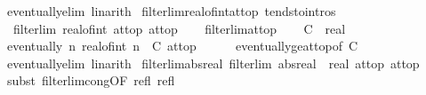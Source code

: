\begin{isabellebody}
\ eventually{\isacharunderscore}{\kern0pt}elim\ linarith\isanewline
{}\isamarkupfalse%
%
\endisatagproof
{\isafoldproof}%
%
\isadelimproof
\isanewline
%
\endisadelimproof
\isanewline
{}\isamarkupfalse%
\ filterlim{\isacharunderscore}{\kern0pt}real{\isacharunderscore}{\kern0pt}of{\isacharunderscore}{\kern0pt}int{\isacharunderscore}{\kern0pt}at{\isacharunderscore}{\kern0pt}top\ {\isacharbrackleft}{\kern0pt}tendsto{\isacharunderscore}{\kern0pt}intros{\isacharbrackright}{\kern0pt}{\isacharcolon}{\kern0pt}\isanewline
\ \ {\isachardoublequoteopen}filterlim\ real{\isacharunderscore}{\kern0pt}of{\isacharunderscore}{\kern0pt}int\ at{\isacharunderscore}{\kern0pt}top\ at{\isacharunderscore}{\kern0pt}top{\isachardoublequoteclose}\isanewline
%
\isadelimproof
\ \ %
\endisadelimproof
%
\isatagproof
{}\isamarkupfalse%
\ filterlim{\isacharunderscore}{\kern0pt}at{\isacharunderscore}{\kern0pt}top\isanewline
{}\isamarkupfalse%
\isanewline
\ \ \isamarkupfalse%
\ C\ {\isacharcolon}{\kern0pt}{\isacharcolon}{\kern0pt}\ real\isanewline
\ \ \isamarkupfalse%
\ {\isachardoublequoteopen}eventually\ {\isacharparenleft}{\kern0pt}{\isasymlambda}n{\isachardot}{\kern0pt}\ real{\isacharunderscore}{\kern0pt}of{\isacharunderscore}{\kern0pt}int\ n\ {\isasymge}\ C{\isacharparenright}{\kern0pt}\ at{\isacharunderscore}{\kern0pt}top{\isachardoublequoteclose}\isanewline
\ \ \ \ \isamarkupfalse%
\ eventually{\isacharunderscore}{\kern0pt}ge{\isacharunderscore}{\kern0pt}at{\isacharunderscore}{\kern0pt}top{\isacharbrackleft}{\kern0pt}of\ {\isachardoublequoteopen}{\isasymlceil}C{\isasymrceil}{\isachardoublequoteclose}{\isacharbrackright}{\kern0pt}\ \isamarkupfalse%
\ eventually{\isacharunderscore}{\kern0pt}elim\ linarith\isanewline
{}\isamarkupfalse%
%
\endisatagproof
{\isafoldproof}%
%
\isadelimproof
\isanewline
%
\endisadelimproof
\isanewline
{}\isamarkupfalse%
\ filterlim{\isacharunderscore}{\kern0pt}abs{\isacharunderscore}{\kern0pt}real{\isacharcolon}{\kern0pt}\ {\isachardoublequoteopen}filterlim\ {\isacharparenleft}{\kern0pt}abs{\isacharcolon}{\kern0pt}{\isacharcolon}{\kern0pt}real\ {\isasymRightarrow}\ real{\isacharparenright}{\kern0pt}\ at{\isacharunderscore}{\kern0pt}top\ at{\isacharunderscore}{\kern0pt}top{\isachardoublequoteclose}\isanewline
%
\isadelimproof
%
\endisadelimproof
%
\isatagproof
{}\isamarkupfalse%
\ {\isacharparenleft}{\kern0pt}subst\ filterlim{\isacharunderscore}{\kern0pt}cong{\isacharbrackleft}{\kern0pt}OF\ refl\ refl{\isacharbrackright}{\kern0pt}{\isacharparenright}{\kern0pt}\isanewline

\end{isabellebody}
